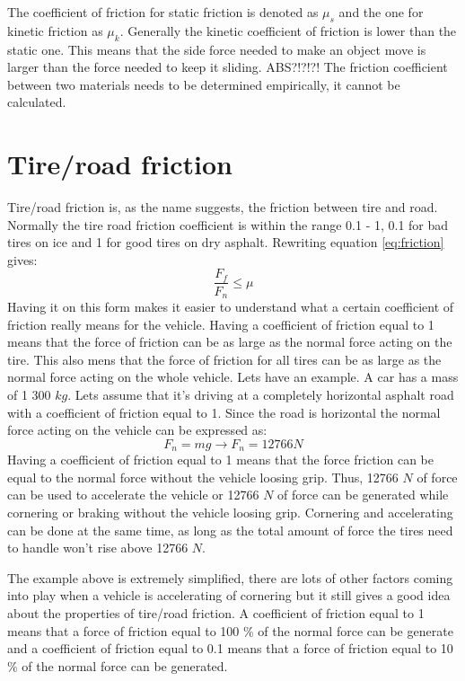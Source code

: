 The coefficient of friction for static friction is denoted as $ \mu_{s} $ and the one for kinetic friction as $ \mu_{k} $. Generally the kinetic coefficient of friction is lower than the static one. This means that the side force needed to make an object move is larger than the force needed to keep it sliding. ABS?!?!?! The friction coefficient between two materials needs to be determined empirically, it cannot be calculated. 

\section{Tire/road friction}
Tire/road friction is, as the name suggests, the friction between tire and road. Normally the tire road friction coefficient is within the range 0.1 - 1, 0.1 for bad tires on ice and 1 for good tires on dry asphalt. Rewriting equation \ref{eq:friction} gives:
\begin{equation} \label{eq:friction2}
\frac{F_{f}}{F_{n}} \leq\mu
\end{equation}
Having it on this form makes it easier to understand what a certain coefficient of friction really means for the vehicle. Having a coefficient of friction equal to 1 means that the force of friction can be as large as the normal force acting on the tire. This also mens that the force of friction for all tires can be as large as the normal force acting on the whole vehicle. Lets have an example. A car has a mass of 1 300 $ kg $. Lets assume that it's driving at a completely horizontal asphalt road with a coefficient of friction equal to 1. Since the road is horizontal the normal force acting on the vehicle can be expressed as:
\begin{equation} \label{eq:friction3}
F_{n}=mg \rightarrow F_{n} = 12766 N 
\end{equation}
Having a coefficient of friction equal to 1 means that the force friction can be equal to the normal force without the vehicle loosing grip. Thus, 12766 $ N $ of force can be used to accelerate the vehicle or 12766 $ N $ of force can be generated while cornering or braking without the vehicle loosing grip. Cornering and accelerating can be done at the same time, as long as the total amount of force the tires need to handle won't rise above 12766 $ N $.

The example above is extremely simplified, there are lots of other factors coming into play when a vehicle is accelerating of cornering but it still gives a good idea about the properties of tire/road friction. A coefficient of friction equal to 1 means that a force of friction equal to 100 $ \% $ of the normal force can be generate and a coefficient of friction equal to 0.1 means that a force of friction equal to 10 $ \% $ of the normal force can be generated.

